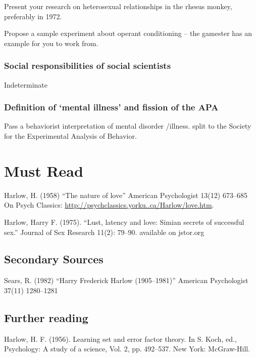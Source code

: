 \begin{refsection}
\begin{writingtask}[Harlow]\label{writingtask:harlow}
Present your research on heterosexual relationships in the rhesus monkey, preferably in 1972.
\end{writingtask}

Propose a sample experiment about operant conditioning -- the gamester has an example for you to work from.

\subsubsection{Social responsibilities of social scientists}
\label{socialresponsibilitiesofsocialscientists}

Indeterminate

\subsubsection{Definition of ‘mental illness’ and fission of the APA}
\label{definitionof‘mentalillness’andfissionoftheapa}

Pass a behaviorist interpretation of mental disorder \slash  illness.
split to the Society for the Experimental Analysis of Behavior.

\section{Must Read}
\label{mustread}

Harlow, H. (1958) “The nature of love” American Psychologist 13(12) 673--685 On Psych Classics: \url{http://psychclassics.yorku..ca/Harlow/love.htm}.

Harlow, Harry F. (1975). ``Lust, latency and love: Simian secrets of successful sex.'' Journal of Sex Research 11(2): 79--90. available on jstor.org

\subsection{Secondary Sources}
\label{secondarysources}

Sears, R. (1982) “Harry Frederick Harlow (1905--1981)” American Psychologist 37(11) 1280--1281

\subsection{Further reading}
\label{furtherreading}

Harlow, H. F. (1956). Learning set and error factor theory. In S. Koch, ed., Psychology: A study of a science, Vol. 2, pp. 492--537. New York: McGraw-Hill.


\end{refsection}
